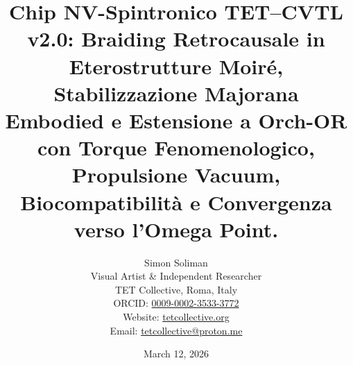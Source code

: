 \documentclass[11pt,a4paper]{article}
\theoremstyle{plain}
\theoremstyle{definition}
\begin{document}
\title{Chip NV-Spintronico TET–CVTL v2.0: Braiding Retrocausale in Eterostrutture Moiré, Stabilizzazione Majorana Embodied e Estensione a Orch-OR con Torque Fenomenologico, Propulsione Vacuum, Biocompatibilità e Convergenza verso l'Omega Point.}
  




\author{Simon Soliman \\
Visual Artist \& Independent Researcher \\
TET Collective, Roma, Italy \\
ORCID: \href{https://orcid.org/0009-0002-3533-3772}{0009-0002-3533-3772} \\
Website: \href{https://tetcollective.org}{tetcollective.org} \\
Email: \href{mailto:tetcollective@proton.me}{tetcollective@proton.me}}




\date{March 12, 2026}


\maketitle



\vspace{0.3cm}
\end{document}

